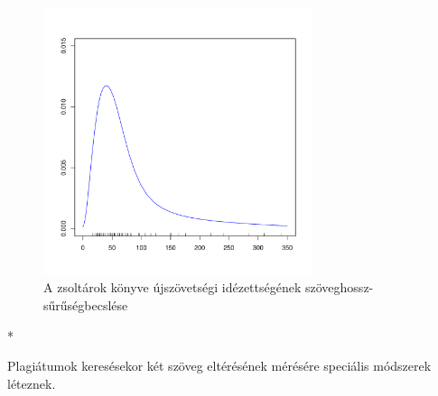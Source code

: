 \documentclass{article}
\begin{document}
\begin{figure}
\begin{center}
\includegraphics[width=0.7\textwidth]{../common/manual_nt_length_density.pdf}
\caption{A zsoltárok könyve újszövetségi idézettségének szöveghossz-sűrűségbecslése}
\label{kezi-hosszak-suruseg}
\end{center}
\end{figure}


\begin{center} *
\end{center}


Plagiátumok keresésekor két szöveg eltérésének mérésére speciális módszerek léteznek.
\end{document}
